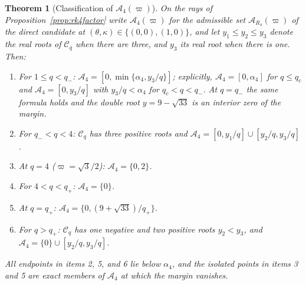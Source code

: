 \documentclass[pdflatex,sn-mathphys-num]{sn-jnl}
\newcommand{\Adm}{\mathcal A}
\theoremstyle{thmstyleone}
\newtheorem{theorem}{Theorem}
\theoremstyle{thmstylethree}
\theoremstyle{thmstyletwo}
\begin{document}
\begin{theorem}[Classification of $\Adm_4(\varpi)$]\label{thm:rk4}
On the rays of Proposition~\ref{prop:rk4factor} write $\Adm_4(\varpi)$ for the admissible set $\Adm_{R_4}(\varpi)$ of the direct candidate at $(\theta,\kappa)\in\{(0,0),(1,0)\}$, and let $y_1\le y_2\le y_3$ denote the real roots of $\mathcal C_q$ when there are three, and $y_3$ its real root when there is one. Then:
\begin{enumerate}
 \item For $1\le q<q_-$: $\Adm_4=[0,\min\{\alpha_4,y_3/q\}]$; explicitly, $\Adm_4=[0,\alpha_4]$ for $q\le q_c$ and $\Adm_4=[0,y_3/q]$ with $y_3/q<\alpha_4$ for $q_c<q<q_-$. At $q=q_-$ the same formula holds and the double root $y=9-\sqrt{33}$ is an interior zero of the margin.
 \item For $q_-<q<4$: $\mathcal C_q$ has three positive roots and $\Adm_4=[0,y_1/q]\cup[y_2/q,y_3/q]$.
 \item At $q=4$ ($\varpi=\sqrt3/2$): $\Adm_4=\{0,2\}$.
 \item For $4<q<q_+$: $\Adm_4=\{0\}$.
 \item At $q=q_+$: $\Adm_4=\{0,(9+\sqrt{33})/q_+\}$.
 \item For $q>q_+$: $\mathcal C_q$ has one negative and two positive roots $y_2<y_3$, and $\Adm_4=\{0\}\cup[y_2/q,y_3/q]$.
\end{enumerate}
All endpoints in items 2, 5, and 6 lie below $\alpha_4$, and the isolated points in items 3 and 5 are exact members of $\Adm_4$ at which the margin vanishes.
\end{theorem}
\end{document}
